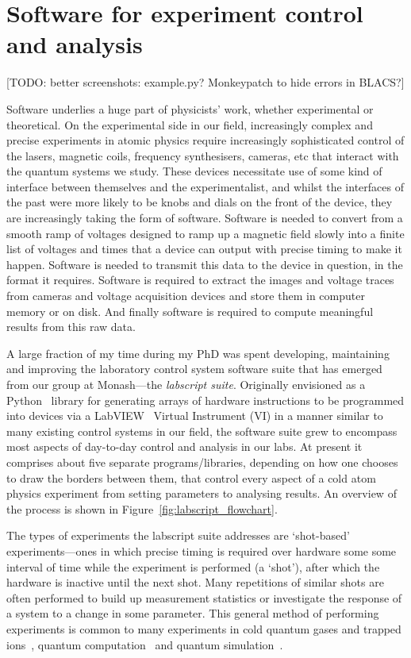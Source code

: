 \chapter{Software for experiment control and analysis}\label{chap:software}

[TODO: better screenshots: example.py? Monkeypatch to hide errors in BLACS?]

Software underlies a huge part of physicists' work, whether experimental or theoretical. On the experimental side in our field, increasingly complex and precise experiments in atomic physics require increasingly sophisticated control of the lasers, magnetic coils, frequency synthesisers, cameras, etc that interact with the quantum systems we study. These devices necessitate use of some kind of interface between themselves and the experimentalist, and whilst the interfaces of the past were more likely to be knobs and dials on the front of the device, they are increasingly taking the form of software. Software is needed to convert from a smooth ramp of voltages designed to ramp up a magnetic field slowly into a finite list of voltages and times that a device can output with precise timing to make it happen. Software is needed to transmit this data to the device in question, in the format it requires. Software is required to extract the images and voltage traces from cameras and voltage acquisition devices and store them in computer memory or on disk. And finally software is required to compute meaningful results from this raw data.

A large fraction of my time during my PhD was spent developing, maintaining and improving the laboratory control system software suite that has emerged from our group at Monash---the \emph{labscript suite}. Originally envisioned as a Python~\cite{python_software_foundation_python_2018} library for generating arrays of hardware instructions to be programmed into devices via a LabVIEW~\cite{national_instruments_laboratory_2018} Virtual Instrument (\textsc{VI}) in a manner similar to many existing control systems in our field, the software suite grew to encompass most aspects of day-to-day control and analysis in our labs. At present it comprises about five separate programs/libraries, depending on how one chooses to draw the borders between them, that control every aspect of a cold atom physics experiment from setting parameters to analysing results. An overview of the process is shown in Figure~\ref{fig:labscript_flowchart}.

The types of experiments the labscript suite addresses are `shot-based' experiments---ones in which precise timing is required over hardware some some interval of time while the experiment is performed (a `shot'), after which the hardware is inactive until the next shot. Many repetitions of similar shots are often performed to build up measurement statistics or investigate the response of a system to a change in some parameter. This general method of performing experiments is common to many experiments in cold quantum gases and trapped ions~\cite{robins_atom_2013-1, cronin_optics_2009-1}, quantum computation~\cite{negretti_quantum_2011-1, ladd_quantum_2010-1} and quantum simulation~\cite{bloch_quantum_2012-1, blatt_quantum_2012-1}.

